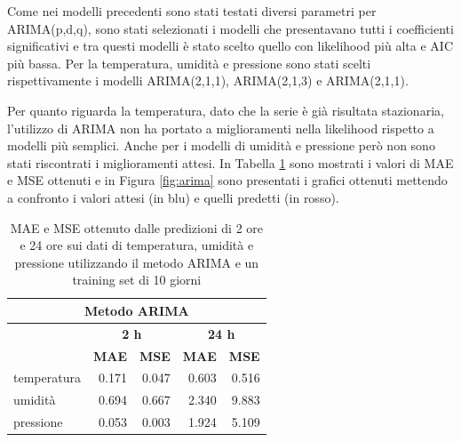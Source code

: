 \documentclass{article}
\begin{document}
Come nei modelli precedenti sono stati testati diversi parametri per ARIMA(p,d,q), sono stati selezionati i modelli che presentavano tutti i coefficienti significativi e tra questi modelli è stato scelto quello con likelihood più alta e AIC  più bassa. Per la temperatura, umidità e pressione sono stati scelti rispettivamente i modelli ARIMA(2,1,1), ARIMA(2,1,3) e ARIMA(2,1,1).

Per quanto riguarda la temperatura, dato che la serie è già risultata stazionaria, l'utilizzo di ARIMA non ha portato a miglioramenti nella likelihood rispetto a modelli più semplici. Anche per i modelli di umidità e pressione però non sono stati riscontrati i miglioramenti attesi. In Tabella \ref{tab:arima} sono mostrati i valori di MAE e MSE ottenuti e in Figura \ref{fig:arima} sono presentati i grafici ottenuti mettendo a confronto i valori attesi (in blu) e quelli predetti (in rosso).

\begin{table}
\centering
\begin{tabular}{l|r|r|r|r}
\multicolumn{5}{c}{{\cellcolor[rgb]{0.875,0.875,0.875}} Metodo ARIMA}                                                                                                                         \\ 
\hline
\rowcolor[rgb]{0.753,0.753,0.753}             & \multicolumn{2}{c|}{\textbf{ 2 h}}                                    & \multicolumn{2}{c}{\textbf{24 h }}                                    \\
\rowcolor[rgb]{0.753,0.753,0.753}             & \multicolumn{1}{c|}{\textbf{MAE}} & \multicolumn{1}{c|}{\textbf{MSE}} & \multicolumn{1}{c|}{\textbf{MAE}} & \multicolumn{1}{c}{\textbf{MSE}}  \\ 
\hline
\rowcolor[rgb]{0.875,0.875,0.875} temperatura & 0.171                             & 0.047                             & 0.603                             & 0.516                             \\
umidità                                       & 0.694                             & 0.667                             & 2.340                             & 9.883                             \\
\rowcolor[rgb]{0.875,0.875,0.875} pressione   & 0.053                             & 0.003                             & 1.924                             & 5.109                            
\end{tabular}
\caption{MAE e MSE ottenuto dalle predizioni di 2 ore e 24 ore sui dati di temperatura, umidità e pressione utilizzando il metodo ARIMA e un training set di 10 giorni}
\label{tab:arima}
\end{table}
\end{document}
